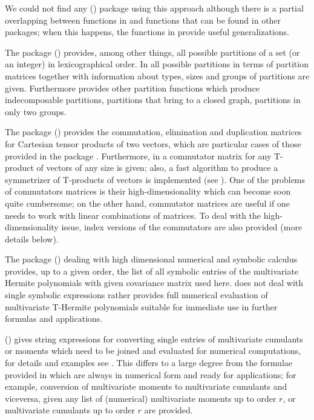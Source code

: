 We could not find any  (\citet{RRR}) package using this approach although there is a partial overlapping between functions in  and functions that can be found in other  packages; when this happens, the functions in  provide useful generalizations.

The package  (\citet{Lai20}) provides, among other things, all possible partitions of a set (or an integer) in lexicographical order. In  all possible partitions in terms of partition matrices together with information about types, sizes and groups of partitions are given. Furthermore  provides other partition functions which produce indecomposable partitions, partitions that bring to a closed graph, partitions in only two groups.

The package  (\citet{Novom21}) provides the commutation, elimination and duplication matrices for Cartesian tensor products of two vectors, which are particular cases of those provided in the package . Furthermore, in  a commutator matrix for any T-product of vectors of any size is given; also, a fast algorithm to produce a symmetrizer of T-products of vectors is implemented (see \citet{Holmquist96}). One of the problems of commutators matrices is their high-dimensionality which can become soon quite cumbersome; on the other hand, commutator matrices are useful if one needs to work with linear combinations of matrices. To deal with the high-dimensionality issue, index versions of the commutators are also provided (more details below).

The package  (\citet{guidotti22}) dealing with high dimensional numerical and symbolic calculus provides, up to a given order, the list of all symbolic entries of the multivariate Hermite polynomials with given covariance matrix used here.  does not deal with single symbolic expressions rather provides full numerical evaluation of multivariate T-Hermite polynomials suitable for immediate use in further formulas and applications.

 (\citet{dinardo22a}) gives string expressions for converting single entries of multivariate cumulants or moments which need to be joined and evaluated for numerical computations, for details and examples see \citet{dinardo22b}. This differs to a large degree from the formulae provided in  which are always in numerical form and ready for applications; for example, conversion of multivariate moments to multivariate cumulants and viceversa, given any list of (numerical) multivariate moments up to order \(r\), or multivariate cumulants up to order \(r\) are provided.

